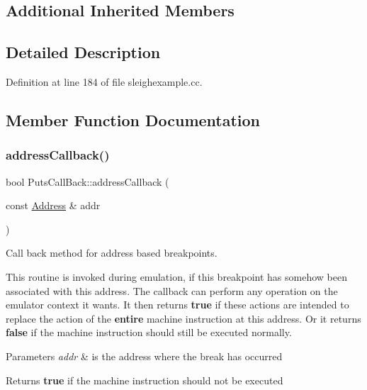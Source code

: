 \subsection*{Additional Inherited Members}


\subsection{Detailed Description}


Definition at line 184 of file sleighexample.\+cc.



\subsection{Member Function Documentation}
\mbox{\label{class_puts_call_back_aed006bcf40674841a1799fa1374017b9}} 
\subsubsection{\texorpdfstring{addressCallback()}{addressCallback()}}
{\footnotesize\ttfamily bool Puts\+Call\+Back\+::address\+Callback (\begin{DoxyParamCaption}\item[{const \mbox{\hyperlink{class_address}{Address}} \&}]{addr }\end{DoxyParamCaption})\hspace{0.3cm}{\ttfamily [virtual]}}



Call back method for address based breakpoints. 

This routine is invoked during emulation, if this breakpoint has somehow been associated with this address. The callback can perform any operation on the emulator context it wants. It then returns {\bfseries{true}} if these actions are intended to replace the action of the {\bfseries{entire}} machine instruction at this address. Or it returns {\bfseries{false}} if the machine instruction should still be executed normally. 
\begin{DoxyParams}{Parameters}
{\em addr} & is the address where the break has occurred \\
\hline
\end{DoxyParams}
\begin{DoxyReturn}{Returns}
{\bfseries{true}} if the machine instruction should not be executed 
\end{DoxyReturn}


